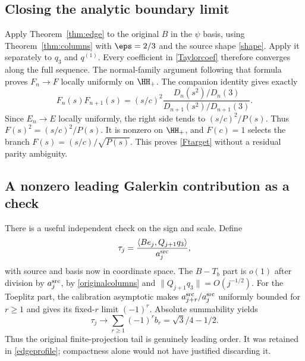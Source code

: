 \subsection{Closing the analytic boundary limit}
Apply Theorem~\ref{thm:edge} to the original $B$ in the $\psi$ basis,
using Theorem~\ref{thm:columns} with $\eps=2/3$ and the source shape
\eqref{shape}. Apply it separately to $q_3$ and $q^{(1)}$.
Every coefficient in \eqref{Taylorcoef} therefore converges along
the full sequence. The normal-family argument following that formula
proves $F_n\to F$ locally uniformly on $\HH_+$.
The companion identity gives exactly
\[
 F_n(s)F_{n+1}(s)
  =(s/c)^2\frac{D_n(s^2)/D_n(3)}{D_{n+1}(s^2)/D_{n+1}(3)}.
\]
Since $E_n\to E$ locally uniformly, the right side tends to
$(s/c)^2/P(s)$. Thus $F(s)^2=(s/c)^2/P(s)$.
It is nonzero on $\HH_+$, and $F(c)=1$ selects the branch
$F(s)=(s/c)/\sqrt{P(s)}$. This proves \eqref{Ftarget} without a
residual parity ambiguity.

\subsection{A nonzero leading Galerkin contribution as a check}
There is a useful independent check on the sign and scale.
Define
\[
 \tau_j=\frac{\langle B e_j,Q_{j+1}q_3\rangle}{a_j^{\rm src}},
\]
with source and basis now in coordinate space. The $B-T_b$ part is
$o(1)$ after division by $a_j^{\rm src}$, by
\eqref{originalcolumns} and $\|Q_{j+1}q_3\|=O(j^{-1/2})$.
For the Toeplitz part, the calibration asymptotic makes
$a_{j+r}^{\rm src}/a_j^{\rm src}$ uniformly bounded for $r\ge1$
and gives its fixed-$r$ limit $(-1)^r$. Absolute summability yields
\begin{equation}\label{taulimit}
 \tau_j\longrightarrow\sum_{r\ge1}(-1)^rb_r=\sqrt3/4-1/2.
\end{equation}
Thus the original finite-projection tail is genuinely leading order.
It was retained in \eqref{edgeprofile}; compactness alone would not
have justified discarding it.
